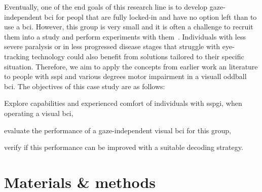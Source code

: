 Eventually, one of the end goals of this research line is to develop
gaze-independent \ac{bci} for peopl that are fully locked-in and have no option left than to use a \ac{bci}.
However, this group is very small and it is often a challenge to recruit them
into a study and perform experiments with them~\cite{Wolpaw2006}.
Individuals with less severe paralysis or in less progressed disease stages that struggle with
eye-tracking technology could also benefit from
solutions tailored to their specific situation.
Therefore, we aim to apply the concepts from earlier work an literature to
people with \ac{sspi} and various degrees motor impairment in a visuall oddball
\ac{bci}.
The objectives of this case study are as follows:
\begin{enumerate*}
  \item Explore capabilities and experienced comfort of individuals with
    \ac{sspgi}, when operating a visual \ac{bci},
  \item evaluate the performance of a gaze-independent visual \ac{bci} for this
    group,
  \item verify if this performance can be improved with a suitable decoding
    strategy.
\end{enumerate*}


\section{Materials \& methods}
